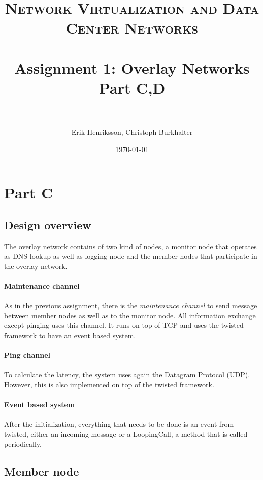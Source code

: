 \documentclass[paper=a4, fontsize=11pt]{scrartcl} %
\title{	
\normalfont \normalsize 
\textsc{Network Virtualization and Data Center Networks} \\ [25pt] %
\horrule{0.5pt} \\[0.4cm] %
\huge Assignment 1: Overlay Networks Part C,D\\ %
\horrule{2pt} \\[0.5cm] %
}
\author{Erik Henriksson, Christoph Burkhalter} %
\date{\normalsize\today} %
\numberwithin{equation}{section} %
\numberwithin{figure}{section} %
\numberwithin{table}{section} %
\begin{document}
\maketitle %

\section{Part C}


\subsection{Design overview}

The overlay network contains of two kind of nodes, a monitor node that operates as DNS lookup as well as logging node and the member nodes that participate in the overlay network.

\paragraph{Maintenance channel}

As in the previous assignment, there is the \textit{maintenance channel} to send message between member nodes as well as to the monitor node. All information exchange except pinging uses this channel. It runs on top of TCP and uses the twisted framework to have an event based system.

\paragraph{Ping channel}

To calculate the latency, the system uses again the Datagram Protocol (UDP). However, this is also implemented on top of the twisted framework.

\paragraph{Event based system}
After the initialization, everything that needs to be done is an event from twisted, either an incoming message or a LoopingCall, a method that is called periodically.


\subsection{Member node}
\end{document}
